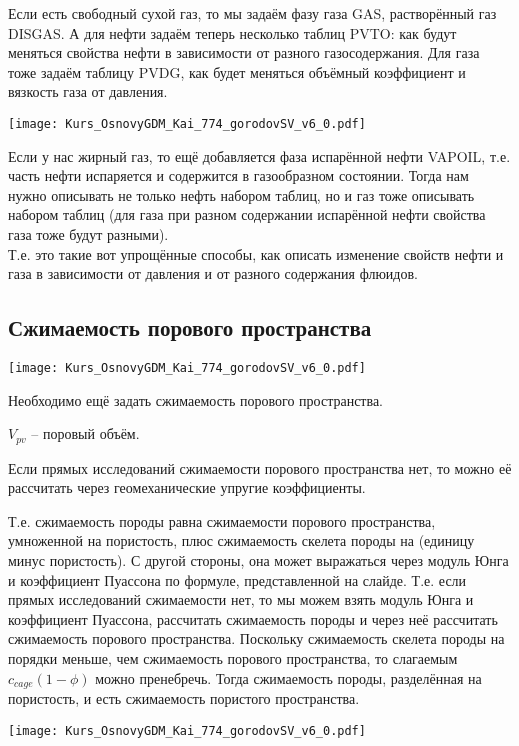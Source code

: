 \documentclass[main.tex]{subfiles}
\begin{document}
Если есть свободный сухой газ, то мы задаём фазу газа GAS, растворённый газ DISGAS.
А для нефти задаём теперь несколько таблиц PVTO: как будут меняться свойства нефти в зависимости от разного газосодержания.
Для газа тоже задаём таблицу PVDG, как будет меняться объёмный коэффициент и вязкость газа от давления.

\texttt{[image: Kurs\_OsnovyGDM\_Kai\_774\_gorodovSV\_v6\_0.pdf]}

Если у нас жирный газ, то ещё добавляется фаза испарённой нефти VAPOIL, т.е. часть нефти испаряется и содержится в газообразном состоянии.
Тогда нам нужно описывать не только нефть набором таблиц, но и газ тоже описывать набором таблиц (для газа при разном содержании испарённой нефти свойства газа тоже будут разными).
\\

Т.е. это такие вот упрощённые способы, как описать изменение свойств нефти и газа в зависимости от давления и от разного содержания флюидов.

\subsection{Сжимаемость порового пространства}

\texttt{[image: Kurs\_OsnovyGDM\_Kai\_774\_gorodovSV\_v6\_0.pdf]}

Необходимо ещё задать сжимаемость порового пространства.

$V_{pv}$ -- поровый объём.

Если прямых исследований сжимаемости порового пространства нет, то можно её рассчитать через геомеханические упругие коэффициенты.

Т.е. сжимаемость породы равна сжимаемости порового пространства, умноженной на пористость, плюс сжимаемость скелета породы на (единицу минус пористость).
С другой стороны, она может выражаться через модуль Юнга и коэффициент Пуассона по формуле, представленной на слайде.
Т.е. если прямых исследований сжимаемости нет, то мы можем взять модуль Юнга и коэффициент Пуассона, рассчитать сжимаемость породы и через неё рассчитать сжимаемость порового пространства.
Поскольку сжимаемость скелета породы на порядки меньше, чем сжимаемость порового пространства, то слагаемым $c_{cage}\left(1-\phi\right)$ можно пренебречь. Тогда сжимаемость породы, разделённая на пористость, и есть сжимаемость пористого пространства.

\texttt{[image: Kurs\_OsnovyGDM\_Kai\_774\_gorodovSV\_v6\_0.pdf]}
\end{document}
